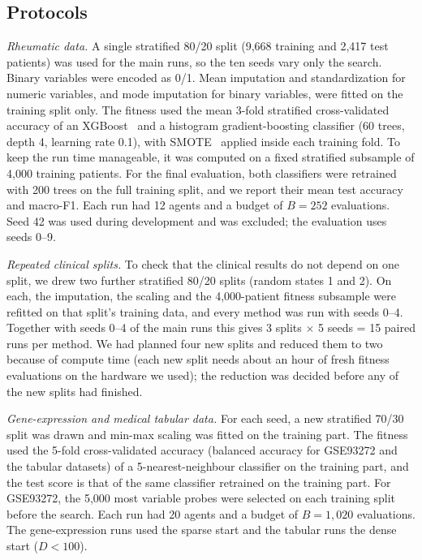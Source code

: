 \documentclass[journal]{IEEEtran}
\begin{document}
\subsection{Protocols}
\emph{Rheumatic data.} A single stratified 80/20 split (9,668 training and 2,417 test patients) was used for the main runs, so the ten seeds vary only the search. Binary variables were encoded as 0/1. Mean imputation and standardization for numeric variables, and mode imputation for binary variables, were fitted on the training split only. The fitness used the mean 3-fold stratified cross-validated accuracy of an XGBoost~\cite{chen2016xgb} and a histogram gradient-boosting classifier (60 trees, depth 4, learning rate 0.1), with SMOTE~\cite{chawla2002} applied inside each training fold. To keep the run time manageable, it was computed on a fixed stratified subsample of 4,000 training patients. For the final evaluation, both classifiers were retrained with 200 trees on the full training split, and we report their mean test accuracy and macro-F1. Each run had 12 agents and a budget of $B=252$ evaluations. Seed 42 was used during development and was excluded; the evaluation uses seeds 0--9.

\emph{Repeated clinical splits.} To check that the clinical results do not depend on one split, we drew two further stratified 80/20 splits (random states 1 and 2). On each, the imputation, the scaling and the 4,000-patient fitness subsample were refitted on that split's training data, and every method was run with seeds 0--4. Together with seeds 0--4 of the main runs this gives 3 splits $\times$ 5 seeds = 15 paired runs per method. We had planned four new splits and reduced them to two because of compute time (each new split needs about an hour of fresh fitness evaluations on the hardware we used); the reduction was decided before any of the new splits had finished.

\emph{Gene-expression and medical tabular data.} For each seed, a new stratified 70/30 split was drawn and min-max scaling was fitted on the training part. The fitness used the 5-fold cross-validated accuracy (balanced accuracy for GSE93272 and the tabular datasets) of a 5-nearest-neighbour classifier on the training part, and the test score is that of the same classifier retrained on the training part. For GSE93272, the 5,000 most variable probes were selected on each training split before the search. Each run had 20 agents and a budget of $B=1{,}020$ evaluations. The gene-expression runs used the sparse start and the tabular runs the dense start ($D<100$).
\end{document}
